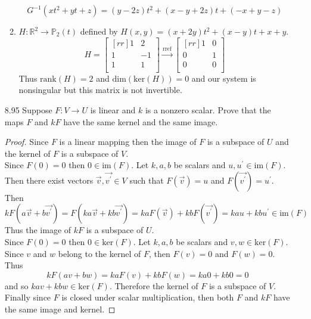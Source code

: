 \documentclass[12pt]{article}
\theoremstyle{definition}
\theoremstyle{plain}
\begin{document}
\begin{enumerate}
\begin{enumerate}
	\[ G^{-1}(xt^2+yt+z)=(y-2z)t^2+(x-y+2z)t+(-x+y-z) \]
	\item $H:\mathbb{R}^2\rightarrow\mathbb{P}_2(t)$ defined by $H(x,y)=(x+2y)t^2+(x-y)t+x+y$.
	\[ H=\begin{bmatrix}[rr]1&2\\1&-1\\1&1\\\end{bmatrix} \xrightarrow[]{\mathrm{rref}} \begin{bmatrix}[rr]1&0\\0&1\\0&0\\\end{bmatrix} \]
	Thus $\mathrm{rank}(H)=2$ and $\mathrm{dim}(\mathrm{ker}(H)) = 0$ and our system is nonsingular but this matrix is not invertible.
	\end{enumerate}

\item[8.95] Suppose $F:V\rightarrow U$ is linear and $k$ is a nonzero scalar. Prove that the maps $F$ and $kF$ have the same kernel and the same image.
	\begin{proof}
	Since $F$ is a linear mapping then the image of $F$ is a subspace of $U$ and the kernel of $F$ is a subspace of $V$.\\
	Since $F(0)=0$ then $0\in \mathrm{im}(F)$. Let $k,a,b$ be scalars and $u,u^\prime \in \mathrm{im}(F)$. Then there exist vectors $\vec{v},\vec{v^\prime} \in V$ such that $F(\vec{v})=u$ and $F(\vec{v^\prime})=u^\prime$. Then
	\[ kF(a\vec{v}+b\vec{v^\prime}) = F(ka\vec{v}+kb\vec{v^\prime}) = kaF(\vec{v})+kbF(\vec{v^\prime}) = kau+kbu^\prime \in \mathrm{im}(F) \]
	Thus the image of $kF$ is a subspace of $U$.\\
	Since $F(0)=0$ then $0\in \mathrm{ker}(F)$. Let $k,a,b$ be scalars and $v,w\in\mathrm{ker}(F)$. Since $v$ and $w$ belong to the kernel of $F$, then $F(v)=0$ and $F(w)=0$. Thus
	\[ kF(av+bw)=kaF(v)+kbF(w)=ka0+kb0=0 \]
	and so $kav+kbw \in \mathrm{ker}(F)$. Therefore the kernel of $F$ is a subspace of $V$.\\
	Finally since $F$ is closed under scalar multiplication, then both $F$ and $kF$ have the same image and kernel.
	\end{proof}


\end{enumerate}
\end{document}
